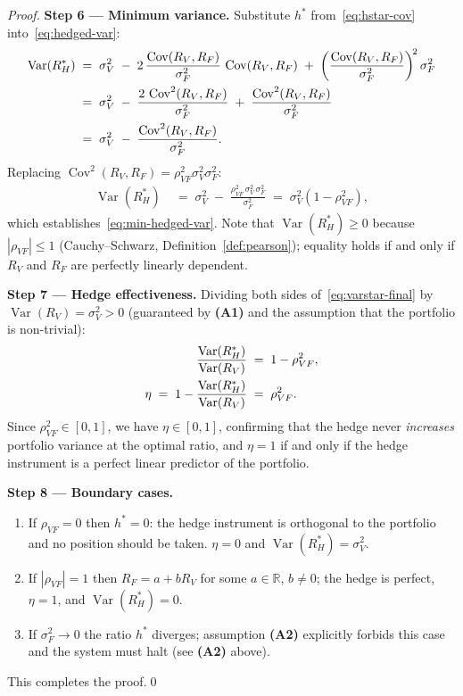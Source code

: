 \documentclass[12pt,openany]{book}
\newcommand{\R}{\mathbb{R}}
\numberwithin{equation}{chapter}
\theoremstyle{plain}
\theoremstyle{definition}
\theoremstyle{remark}
\numberwithin{equation}{chapter}
\theoremstyle{plain}
\DeclareMathOperator{\Var}{Var}
\DeclareMathOperator{\Cov}{Cov}
\begin{document}
\begin{proof}
\medskip
\noindent\textbf{Step 6 — Minimum variance.}
Substitute $h^*$ from~\eqref{eq:hstar-cov} into~\eqref{eq:hedged-var}:
\begin{align}
  \Var(R_H^*)
    &\;=\; \sigma_V^2
           \;-\; 2\,\frac{\Cov(R_V,R_F)}{\sigma_F^2}\,\Cov(R_V,R_F)
           \;+\; \left(\frac{\Cov(R_V,R_F)}{\sigma_F^2}\right)^{\!2}
           \sigma_F^2
  \notag\\
    &\;=\; \sigma_V^2
           \;-\; \frac{2\,\Cov^2(R_V,R_F)}{\sigma_F^2}
           \;+\; \frac{\Cov^2(R_V,R_F)}{\sigma_F^2}
  \notag\\
    &\;=\; \sigma_V^2
           \;-\; \frac{\Cov^2(R_V,R_F)}{\sigma_F^2}.
  \label{eq:varstar-cov}
\end{align}
Replacing $\Cov^2(R_V,R_F) = \rho_{VF}^2\sigma_V^2\sigma_F^2$:
\begin{align}
  \Var(R_H^*)
    &\;=\; \sigma_V^2
           \;-\; \frac{\rho_{VF}^2\,\sigma_V^2\,\sigma_F^2}{\sigma_F^2}
    \;=\; \sigma_V^2 \!\left(1 - \rho_{VF}^2\right),
  \label{eq:varstar-final}
\end{align}
which establishes~\eqref{eq:min-hedged-var}.
Note that $\Var(R_H^*) \geq 0$ because $|\rho_{VF}| \leq 1$
(Cauchy--Schwarz, Definition~\ref{def:pearson}); equality holds
if and only if $R_V$ and $R_F$ are perfectly linearly dependent.

\medskip
\noindent\textbf{Step 7 — Hedge effectiveness.}
Dividing both sides of~\eqref{eq:varstar-final} by
$\Var(R_V) = \sigma_V^2 > 0$ (guaranteed by \textbf{(A1)} and
the assumption that the portfolio is non-trivial):
\begin{align}
  \frac{\Var(R_H^*)}{\Var(R_V)}
    &\;=\; 1 - \rho_{VF}^2,
  \notag\\
  \eta
    \;=\; 1 - \frac{\Var(R_H^*)}{\Var(R_V)}
    &\;=\; \rho_{VF}^2.
  \label{eq:eta-final}
\end{align}
Since $\rho_{VF}^2 \in [0,1]$, we have $\eta \in [0,1]$,
confirming that the hedge never \emph{increases} portfolio variance
at the optimal ratio, and $\eta = 1$ if and only if the hedge
instrument is a perfect linear predictor of the portfolio.

\medskip
\noindent\textbf{Step 8 — Boundary cases.}
\begin{enumerate}
  \item If $\rho_{VF} = 0$ then $h^* = 0$: the hedge instrument
        is orthogonal to the portfolio and no position should be taken.
        $\eta = 0$ and $\Var(R_H^*) = \sigma_V^2$.
  \item If $|\rho_{VF}| = 1$ then $R_F = a + b R_V$ for some
        $a \in \R$, $b \neq 0$; the hedge is perfect, $\eta = 1$,
        and $\Var(R_H^*) = 0$.
  \item If $\sigma_F^2 \to 0$ the ratio $h^*$ diverges; assumption
        \textbf{(A2)} explicitly forbids this case and the system
        must halt (see \textbf{(A2)} above).
\end{enumerate}
This completes the proof.\qed
\end{proof}
\end{document}
